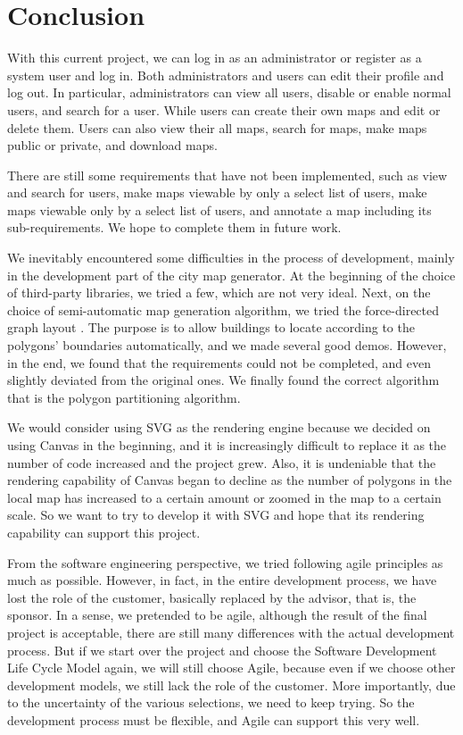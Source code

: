 \section{Conclusion}
\label{sec:Conclusion}

With this current project, we can log in as an administrator or register as a system user and log in. Both administrators and users can edit their profile and log out. In particular, administrators can view all users, disable or enable normal users, and search for a user. While users can create their own maps and edit or delete them. Users can also view their all maps, search for maps, make maps public or private, and download maps.

There are still some requirements that have not been implemented, such as view and search for users, make maps viewable by only a select list of users, make maps viewable only by a select list of users, and annotate a map including its sub-requirements. We hope to complete them in future work.

We inevitably encountered some difficulties in the process of development, mainly in the development part of the city map generator. At the beginning of the choice of third-party libraries, we tried a few, which are not very ideal. Next, on the choice of semi-automatic map generation algorithm, we tried the force-directed graph layout \cite{web:D3-force}. The purpose is to allow buildings to locate according to the polygons' boundaries automatically, and we made several good demos. However, in the end, we found that the requirements could not be completed, and even slightly deviated from the original ones. We finally found the correct algorithm that is the polygon partitioning algorithm.

We would consider using SVG as the rendering engine because we decided on using Canvas in the beginning, and it is increasingly difficult to replace it as the number of code increased and the project grew. Also, it is undeniable that the rendering capability of Canvas began to decline as the number of polygons in the local map has increased to a certain amount or zoomed in the map to a certain scale. So we want to try to develop it with SVG and hope that its rendering capability can support this project.

From the software engineering perspective, we tried following agile principles as much as possible. However, in fact, in the entire development process, we have lost the role of the customer, basically replaced by the advisor, that is, the sponsor. In a sense, we pretended to be agile, although the result of the final project is acceptable, there are still many differences with the actual development process. But if we start over the project and choose the Software Development Life Cycle Model again, we will still choose Agile, because even if we choose other development models, we still lack the role of the customer. More importantly, due to the uncertainty of the various selections, we need to keep trying. So the development process must be flexible, and Agile can support this very well.
